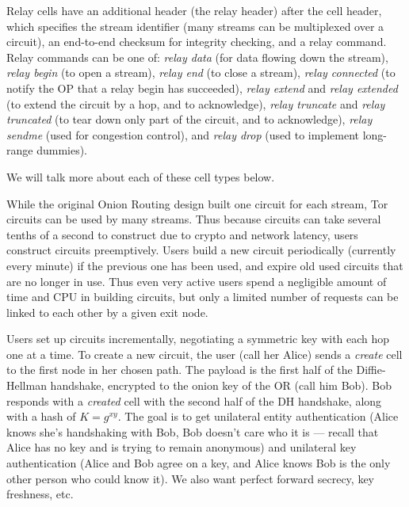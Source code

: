 \documentclass[times,10pt,twocolumn]{article}
\begin{document}
Relay cells have an additional header (the relay header) after the
cell header, which specifies the stream identifier (many streams can
be multiplexed over a circuit), an end-to-end checksum for integrity
checking, and a relay command. Relay commands can be one of: \emph{relay
data} (for data flowing down the stream), \emph{relay begin} (to open a
stream), \emph{relay end} (to close a stream), \emph{relay connected}
(to notify the OP that a relay begin has succeeded), \emph{relay
extend} and \emph{relay extended} (to extend the circuit by a hop,
and to acknowledge), \emph{relay truncate} and \emph{relay truncated}
(to tear down only part of the circuit, and to acknowledge), \emph{relay
sendme} (used for congestion control), and \emph{relay drop} (used to
implement long-range dummies).

We will talk more about each of these cell types below.


\label{subsec:circuits}

While the original Onion Routing design built one circuit for each stream,
Tor circuits can be used by many streams. Thus because circuits can
take several tenths of a second to construct due to crypto and network
latency, users construct circuits preemptively. Users build a new circuit
periodically (currently every minute) if the previous one has been used,
and expire old used circuits that are no longer in use. Thus even very
active users spend a negligible amount of time and CPU in building
circuits, but only a limited number of requests can be linked to each
other by a given exit node.

Users set up circuits incrementally, negotiating a symmetric key with
each hop one at a time. To create a new circuit, the user (call her
Alice) sends a \emph{create} cell to the first node in her chosen
path. The payload is the first half of the Diffie-Hellman handshake,
encrypted to the onion key of the OR (call him Bob). Bob responds with a
\emph{created} cell with the second half of the DH handshake, along with
a hash of $K=g^{xy}$. The goal is to get unilateral entity authentication
(Alice knows she's handshaking with Bob, Bob doesn't care who it is ---
recall that Alice has no key and is trying to remain anonymous) and
unilateral key authentication (Alice and Bob agree on a key, and Alice
knows Bob is the only other person who could know it). We also want
perfect forward secrecy, key freshness, etc.
\end{document}

